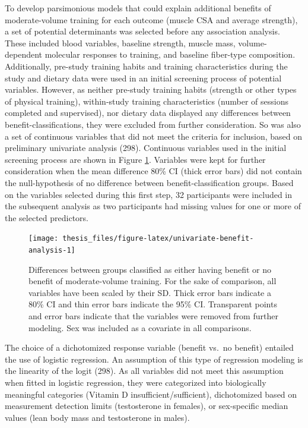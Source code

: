 \documentclass[twoside,10pt]{gihclass} %
\begin{document}
To develop parsimonious models that could explain additional benefits of moderate-volume training for each outcome (muscle CSA and average strength), a set of potential determinants was selected before any association analysis. These included blood variables, baseline strength, muscle mass, volume-dependent molecular responses to training, and baseline fiber-type composition. Additionally, pre-study training habits and training characteristics during the study and dietary data were used in an initial screening process of potential variables. However, as neither pre-study training habits (strength or other types of physical training), within-study training characteristics (number of sessions completed and supervised), nor dietary data displayed any differences between benefit-classifications, they were excluded from further consideration. So was also a set of continuous variables that did not meet the criteria for inclusion, based on preliminary univariate analysis (298).
Continuous variables used in the initial screening process are shown in Figure \ref{fig:univariate-benefit-analysis}. Variables were kept for further consideration when the mean difference 80\% CI (thick error bars) did not contain the null-hypothesis of no difference between benefit-classification groups. Based on the variables selected during this first step, 32 participants were included in the subsequent analysis as two participants had missing values for one or more of the selected predictors.
\begin{figure}

{\centering \texttt{[image: thesis\_files/figure-latex/univariate-benefit-analysis-1]} 

}

\caption[Univariate analysis of potential determinants of benefit to moderat- over low-volume training]{Differences between groups classified as either having benefit or no benefit of moderate-volume training. For the sake of comparison, all variables have been scaled by their SD. Thick error bars indicate a 80\% CI and thin error bars indicate the 95\% CI. Transparent points and error bars indicate that the variables were removed from further modeling. Sex was included as a covariate in all comparisons.}\label{fig:univariate-benefit-analysis}
\end{figure}
The choice of a dichotomized response variable (benefit vs.~no benefit) entailed the use of logistic regression. An assumption of this type of regression modeling is the linearity of the logit
(298).
As all variables did not meet this assumption when fitted in logistic regression, they were categorized into biologically meaningful categories (Vitamin D insufficient/sufficient), dichotomized based on measurement detection limits (testosterone in females), or sex-specific median values (lean body mass and testosterone in males).
\end{document}
